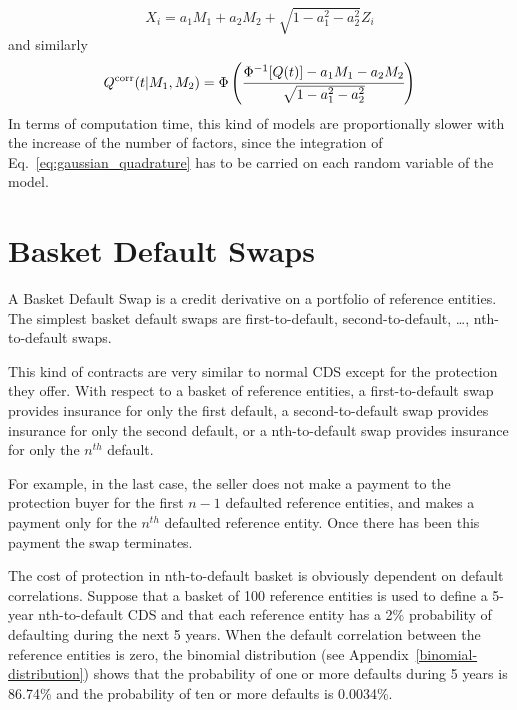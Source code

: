 \begin{equation}
X_i = a_1 M_1 + a_2 M_2 + \sqrt{1 - a_1^2 - a^2_2}Z_i
\end{equation}
and similarly
\begin{equation}
Q^{\textrm{corr}}(t|M_1, M_2) = \Phi\left(\cfrac{\Phi^{-1}[Q(t)]-a_1 M_1 - a_2 M_2}{\sqrt{1 - a_1^2 - a^2_2}}\right)
\end{equation}
In terms of computation time, this kind of models are proportionally slower with the increase of the number of factors, since the integration of Eq.~\ref{eq:gaussian_quadrature} has to be carried on each random variable of the model.

\section{Basket Default Swaps}\label{basket-default-swaps}

A Basket Default Swap is a credit derivative on a portfolio of reference
entities. The simplest basket default swaps are first-to-default,
second-to-default, \ldots, nth-to-default swaps. 

This kind of contracts are very similar to normal CDS except for the protection they offer.
With respect to a basket of reference entities, a first-to-default swap provides insurance for only the first default, a second-to-default swap provides insurance
for only the second default, or a nth-to-default swap provides insurance for only the $n^{th}$ default. 

For example, in the last case, the seller does not make a payment to the protection buyer for
the first $n-1$ defaulted reference entities, and makes a payment only for the
$n^{th}$ defaulted reference entity. Once there has been this payment the swap terminates.

The cost of protection in nth-to-default basket is obviously dependent on default correlations. 
Suppose that a basket of 100 reference entities is used to define a 5-year nth-to-default CDS and that each reference entity has a 2\% probability of defaulting during the next
5 years. When the default correlation between the reference entities is zero, the binomial distribution (see Appendix~\ref{binomial-distribution}) 
shows that the probability of one or more defaults during 5 years is 86.74\% and the probability of ten or more defaults is 0.0034\%.

